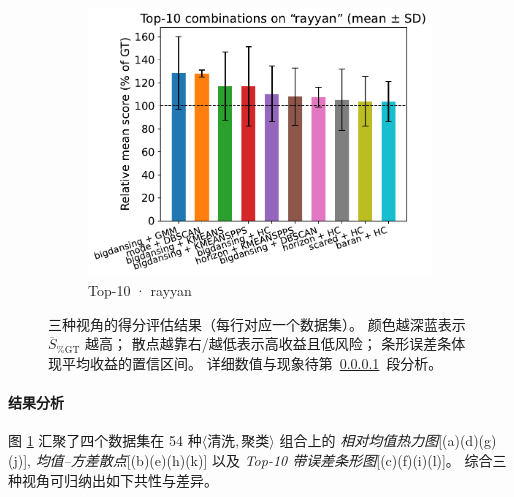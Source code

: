 \documentclass[10pt]{article} %
\numberwithin{equation}{section}
\begin{document}
\begin{figure}[htbp]
\begin{subfigure}{0.34\linewidth}
    \centering
    \includegraphics[width=\linewidth]{figures/5.3.1graph/top10_bar_error_rayyan.pdf}
    \caption{Top-10 · rayyan}
  \end{subfigure}

  \caption{三种视角的得分评估结果（每行对应一个数据集）。%
           颜色越深蓝表示 \(\overline{S}_{\%\mathrm{GT}}\) 越高；%
           散点越靠右/越低表示高收益且低风险；%
           条形误差条体现平均收益的置信区间。%
           详细数值与现象待第~\ref{sec:score_eval_exp_analysis}~段分析。}
  \label{fig:score_eval_all}
\end{figure}

\paragraph{结果分析}
\label{sec:score_eval_exp_analysis}

图 \ref{fig:score_eval_all} 汇聚了四个数据集在
54 种\(\langle\!\text{清洗},\text{聚类}\!\rangle\) 组合上的
\emph{相对均值热力图}[(a)(d)(g)(j)],
\emph{均值–方差散点}[(b)(e)(h)(k)]
以及 \emph{Top-10 带误差条形图}[(c)(f)(i)(l)]。
综合三种视角可归纳出如下共性与差异。
\end{document}
